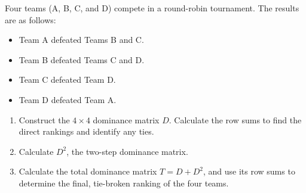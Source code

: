 \bigskip

\begin{problem}
Four teams (A, B, C, and D) compete in a round-robin tournament. The results are as follows:
\begin{itemize}
  \item Team A defeated Teams B and C.
  \item Team B defeated Teams C and D.
  \item Team C defeated Team D.
  \item Team D defeated Team A.
\end{itemize}

\begin{enumerate}[label=\textbf{(\alph*)}]
  \item Construct the $4 \times 4$ dominance matrix $D$. Calculate the row sums to find the direct rankings and identify any ties.
  \item Calculate $D^2$, the two-step dominance matrix.
  \item Calculate the total dominance matrix $T = D + D^2$, and use its row sums to determine the final, tie-broken ranking of the four teams.
\end{enumerate}
\end{problem}

